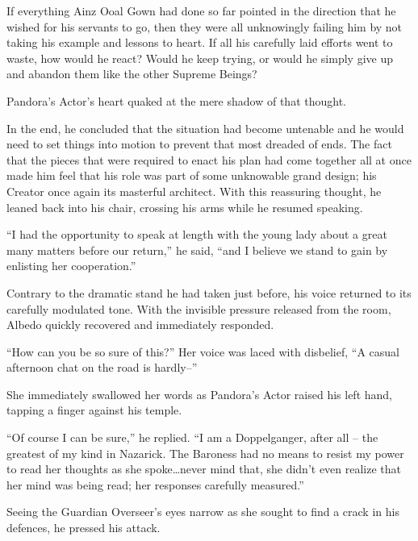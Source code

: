  

If everything Ainz Ooal Gown had done so far pointed in the direction that he wished for his servants to go, then they were all unknowingly failing him by not taking his example and lessons to heart. If all his carefully laid efforts went to waste, how would he react? Would he keep trying, or would he simply give up and abandon them like the other Supreme Beings?

 

Pandora’s Actor’s heart quaked at the mere shadow of that thought.

 

In the end, he concluded that the situation had become untenable and he would need to set things into motion to prevent that most dreaded of ends. The fact that the pieces that were required to enact his plan had come together all at once made him feel that his role was part of some unknowable grand design; his Creator once again its masterful architect. With this reassuring thought, he leaned back into his chair, crossing his arms while he resumed speaking.

 

“I had the opportunity to speak at length with the young lady about a great many matters before our return,” he said, “and I believe we stand to gain by enlisting her cooperation.”

 

Contrary to the dramatic stand he had taken just before, his voice returned to its carefully modulated tone. With the invisible pressure released from the room, Albedo quickly recovered and immediately responded.

 

“How can you be so sure of this?” Her voice was laced with disbelief, “A casual afternoon chat on the road is hardly–”

 

She immediately swallowed her words as Pandora’s Actor raised his left hand, tapping a finger against his temple.

 

“Of course I can be sure,” he replied. “I am a Doppelganger, after all – the greatest of my kind in Nazarick. The Baroness had no means to resist my power to read her thoughts as she spoke…never mind that, she didn’t even realize that her mind was being read; her responses carefully measured.”

 

Seeing the Guardian Overseer’s eyes narrow as she sought to find a crack in his defences, he pressed his attack.

